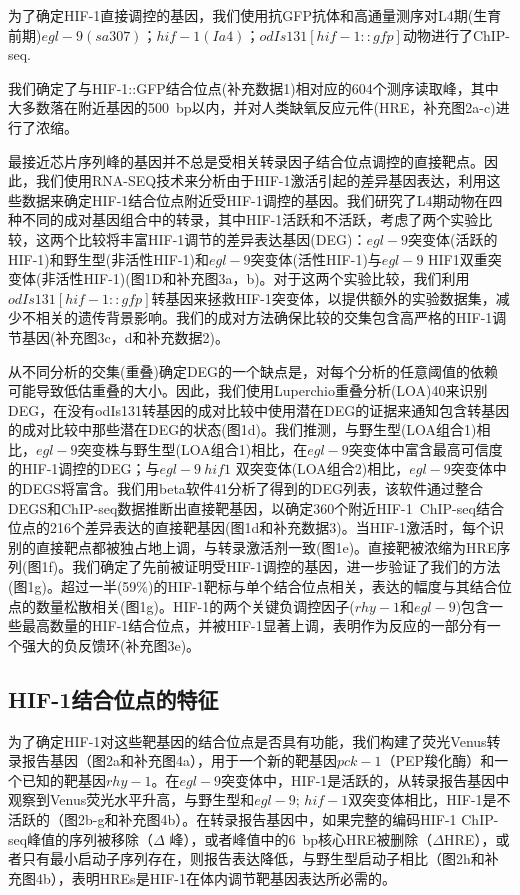 \documentclass{ctexart}
\begin{document}
        为了确定HIF-1直接调控的基因，我们使用抗GFP抗体和高通量测序对L4期(生育前期)$egl-9(sa307)$；$hif-1(Ia4)$；$odIs131[hif-1::gfp]$动物进行了ChIP-seq.
        
        我们确定了与HIF-1::GFP结合位点(补充数据1)相对应的604个测序读取峰，其中大多数落在附近基因的500~bp以内，并对人类缺氧反应元件(HRE，补充图2a-c)进行了浓缩。
        
        最接近芯片序列峰的基因并不总是受相关转录因子结合位点调控的直接靶点。因此，我们使用RNA-SEQ技术来分析由于HIF-1激活引起的差异基因表达，利用这些数据来确定HIF-1结合位点附近受HIF-1调控的基因。我们研究了L4期动物在四种不同的成对基因组合中的转录，其中HIF-1活跃和不活跃，考虑了两个实验比较，这两个比较将丰富HIF-1调节的差异表达基因(DEG)：$egl-9$突变体(活跃的HIF-1)和野生型(非活性HIF-1)和$egl-9$突变体(活性HIF-1)与$egl-9$ HIF1双重突变体(非活性HIF-1)(图1D和补充图3a，b)。对于这两个实验比较，我们利用$odIs131[hif-1::gfp]$转基因来拯救HIF-1突变体，以提供额外的实验数据集，减少不相关的遗传背景影响。我们的成对方法确保比较的交集包含高严格的HIF-1调节基因(补充图3c，d和补充数据2)。
        
        从不同分析的交集(重叠)确定DEG的一个缺点是，对每个分析的任意阈值的依赖可能导致低估重叠的大小。因此，我们使用Luperchio重叠分析(LOA)40来识别DEG，在没有odIs131转基因的成对比较中使用潜在DEG的证据来通知包含转基因的成对比较中那些潜在DEG的状态(图1d)。我们推测，与野生型(LOA组合1)相比，$egl-9$突变株与野生型(LOA组合1)相比，在$egl-9$突变体中富含最高可信度的HIF-1调控的DEG；与$egl-9~hif1$ 双突变体(LOA组合2)相比，$egl-9$突变体中的DEGS将富含。我们用beta软件41分析了得到的DEG列表，该软件通过整合DEGS和ChIP-seq数据推断出直接靶基因，以确定360个附近HIF-1~ChIP-seq结合位点的216个差异表达的直接靶基因(图1d和补充数据3)。当HIF-1激活时，每个识别的直接靶点都被独占地上调，与转录激活剂一致(图1e)。直接靶被浓缩为HRE序列(图1f)。我们确定了先前被证明受HIF-1调控的基因，进一步验证了我们的方法(图1g)。超过一半(59\%)的HIF-1靶标与单个结合位点相关，表达的幅度与其结合位点的数量松散相关(图1g)。HIF-1的两个关键负调控因子($rhy-1$和$egl-9$)包含一些最高数量的HIF-1结合位点，并被HIF-1显著上调，表明作为反应的一部分有一个强大的负反馈环(补充图3e)。

    \subsection{HIF-1结合位点的特征}

        为了确定HIF-1对这些靶基因的结合位点是否具有功能，我们构建了荧光Venus转录报告基因（图2a和补充图4a），用于一个新的靶基因$pck-1$（PEP羧化酶）和一个已知的靶基因$rhy-1$。在$egl-9$突变体中，HIF-1是活跃的，从转录报告基因中观察到Venus荧光水平升高，与野生型和$egl-9$; $hif-1$双突变体相比，HIF-1是不活跃的（图2b-g和补充图4b）。在转录报告基因中，如果完整的编码HIF-1 ChIP-seq峰值的序列被移除（$\Delta$ 峰），或者峰值中的6~bp核心HRE被删除（$\Delta$HRE），或者只有最小启动子序列存在，则报告表达降低，与野生型启动子相比（图2h和补充图4b），表明HREs是HIF-1在体内调节靶基因表达所必需的。
\end{document}
